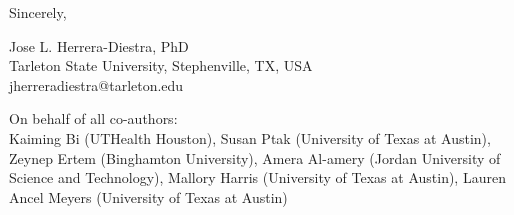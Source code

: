 \documentclass[12pt]{article}
\begin{document}
\vspace{0.5cm}

Sincerely,

\vspace{0.3cm}

Jose L. Herrera-Diestra, PhD\\
Tarleton State University, Stephenville, TX, USA\\
jherreradiestra@tarleton.edu\\

\vspace{0.2cm}

\noindent On behalf of all co-authors:\\
Kaiming Bi (UTHealth Houston),
Susan Ptak (University of Texas at Austin),
Zeynep Ertem (Binghamton University),
Amera Al-amery (Jordan University of Science and Technology),
Mallory Harris (University of Texas at Austin),
Lauren Ancel Meyers (University of Texas at Austin)
\end{document}
